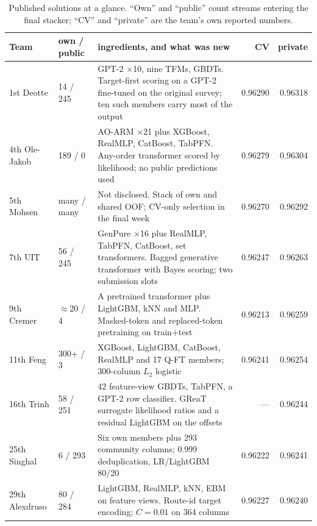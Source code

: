 \begin{table}[t]
\centering
\small
\caption{Published solutions at a glance. ``Own'' and ``public'' count streams entering the
final stacker; ``CV'' and ``private'' are the team's own reported numbers.}
\label{tab:systems}
\begin{tabular}{p{2.05cm}p{1.8cm}p{7.95cm}rr}
\toprule
Team & own / public & ingredients, and what was new & CV & private\\
\midrule
1st Deotte & 14 / 245
  & GPT-2 $\times$10, nine TFMs, GBDTs. Target-first scoring on a GPT-2 fine-tuned on the
    original survey; ten such members carry most of the output
  & 0.96290 & 0.96318\\
4th Ole-Jakob & 189 / 0
  & AO-ARM $\times$21 plus XGBoost, RealMLP, CatBoost, TabPFN. Any-order transformer scored
    by likelihood; no public predictions used
  & 0.96279 & 0.96304\\
5th Mohsen & many / many
  & Not disclosed. Stack of own and shared OOF; CV-only selection in the final week
  & 0.96270 & 0.96292\\
7th UIT & 56 / 245
  & GenPure $\times$16 plus RealMLP, TabPFN, CatBoost, set transformers. Bagged generative
    transformer with Bayes scoring; two submission slots
  & 0.96247 & 0.96263\\
9th Cremer & $\approx$20 / 4
  & A pretrained transformer plus LightGBM, kNN and MLP. Masked-token and replaced-token
    pretraining on train$+$test
  & 0.96213 & 0.96259\\
11th Feng & 300+ / 3
  & XGBoost, LightGBM, CatBoost, RealMLP and 17 Q-FT members; 300-column $L_2$ logistic
  & 0.96241 & 0.96254\\
16th Trinh & 58 / 251
  & 42 feature-view GBDTs, TabPFN, a GPT-2 row classifier. GReaT surrogate likelihood ratios
    and a residual LightGBM on the offsets
  & --- & 0.96244\\
25th Singhal & 6 / 293
  & Six own members plus 293 community columns; 0.999 deduplication, LR/LightGBM 80/20
  & 0.96222 & 0.96241\\
29th Alexdruso & 80 / 284
  & LightGBM, RealMLP, kNN, EBM on feature views. Route-id target encoding; $C=0.01$ on 364
    columns
  & 0.96227 & 0.96240\\
\bottomrule
\end{tabular}
\end{table}

